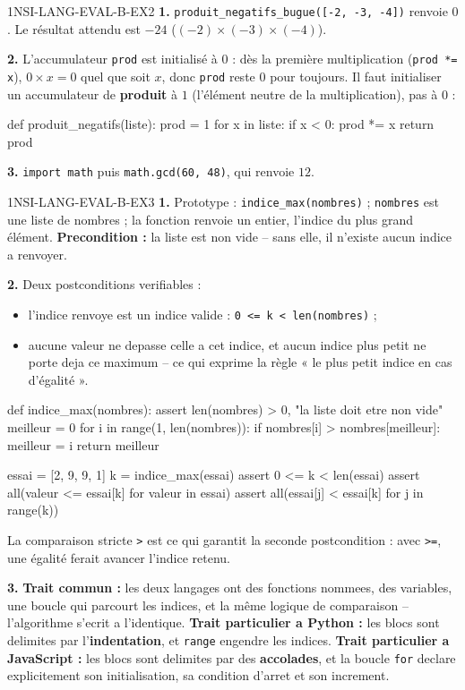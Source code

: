 \begin{corrige}{1NSI-LANG-EVAL-B-EX2}
\textbf{1.} \lstinline{produit_negatifs_bugue([-2, -3, -4])} renvoie $0$. Le résultat
attendu est $-24$ ($(-2)\times(-3)\times(-4)$).

\textbf{2.} L'accumulateur \lstinline{prod} est initialisé à $0$ : dès la première
multiplication (\lstinline{prod *= x}), $0\times x=0$ quel que soit $x$, donc
\lstinline{prod} reste $0$ pour toujours. Il faut initialiser un accumulateur de
\textbf{produit} à $1$ (l'élément neutre de la multiplication), pas à $0$ :
\begin{python}
def produit_negatifs(liste):
    prod = 1
    for x in liste:
        if x < 0:
            prod *= x
    return prod
\end{python}

\textbf{3.} \lstinline{import math} puis \lstinline{math.gcd(60, 48)}, qui renvoie $12$.
\end{corrige}

\begin{corrige}{1NSI-LANG-EVAL-B-EX3}
\textbf{1.} Prototype : \lstinline{indice_max(nombres)} ; \lstinline{nombres} est une liste
de nombres ; la fonction renvoie un entier, l'indice du plus grand élément.
\textbf{Precondition :} la liste est non vide -- sans elle, il n'existe aucun indice a
renvoyer.

\textbf{2.} Deux postconditions verifiables :
\begin{itemize}
  \item l'indice renvoye est un indice valide : \lstinline{0 <= k < len(nombres)} ;
  \item aucune valeur ne depasse celle a cet indice, et aucun indice plus petit ne porte
  deja ce maximum -- ce qui exprime la règle « le plus petit indice en cas d'égalité ».
\end{itemize}

\begin{python}
def indice_max(nombres):
    assert len(nombres) > 0, "la liste doit etre non vide"
    meilleur = 0
    for i in range(1, len(nombres)):
        if nombres[i] > nombres[meilleur]:
            meilleur = i
    return meilleur


essai = [2, 9, 9, 1]
k = indice_max(essai)
assert 0 <= k < len(essai)
assert all(valeur <= essai[k] for valeur in essai)
assert all(essai[j] < essai[k] for j in range(k))
\end{python}

La comparaison stricte \lstinline{>} est ce qui garantit la seconde postcondition : avec
\lstinline{>=}, une égalité ferait avancer l'indice retenu.

\textbf{3.} \textbf{Trait commun :} les deux langages ont des fonctions nommees, des
variables, une boucle qui parcourt les indices, et la même logique de comparaison --
l'algorithme s'ecrit a l'identique. \textbf{Trait particulier a Python :} les blocs sont
delimites par l'\textbf{indentation}, et \lstinline{range} engendre les indices.
\textbf{Trait particulier a JavaScript :} les blocs sont delimites par des \textbf{accolades},
et la boucle \lstinline{for} declare explicitement son initialisation, sa condition d'arret
et son increment.
\end{corrige}
